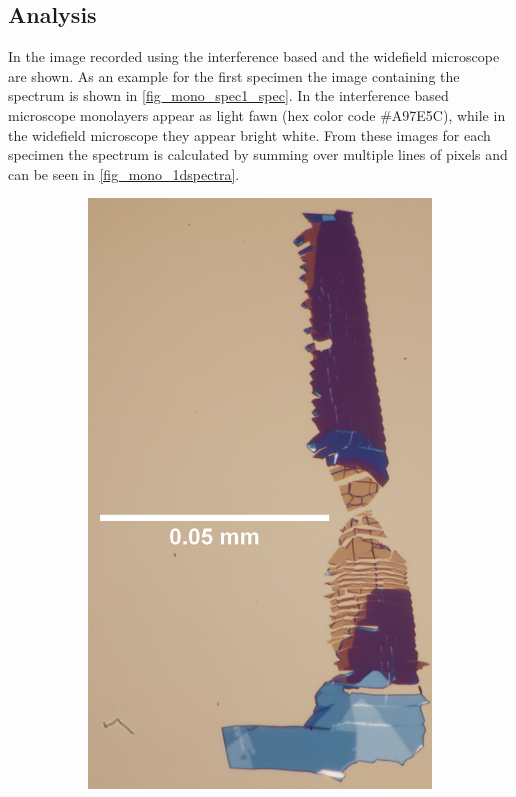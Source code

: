 \subsection{Analysis}

In  the image recorded using the interference based and the widefield microscope are shown.
As an example for the first specimen the image containing the spectrum is shown in \cref{fig_mono_spec1_spec}.
In the interference based microscope monolayers appear as light fawn (hex color code \#A97E5C), while in the widefield microscope they appear bright white.
From these images for each specimen the spectrum is calculated by summing over multiple lines of pixels and can be seen in \cref{fig_mono_1dspectra}.

\begin{figure}[!ht]
    \centering
    \begin{subfigure}{0.47\textwidth}
        \centering
        \includegraphics[width=1.0\textwidth]{img/output_t1/M1_3_100_adj}

\end{subfigure}
\end{figure}
